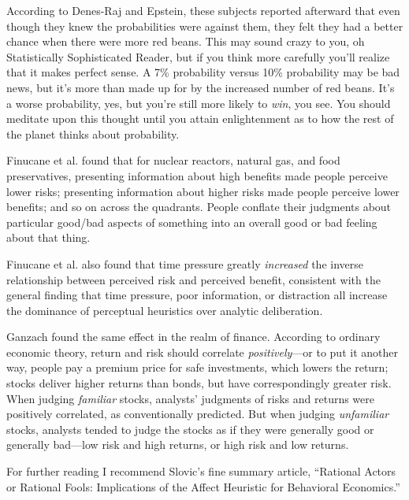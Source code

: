{
 According to Denes-Raj and Epstein, these subjects reported
afterward that even though they knew the probabilities were against
them, they felt they had a better chance when there were more red
beans. This may sound crazy to you, oh Statistically Sophisticated
Reader, but if you think more carefully you'll realize
that it makes perfect sense. A 7\% probability versus 10\% probability
may be bad news, but it's more than made up for by the
increased number of red beans. It's a worse
probability, yes, but you're still more likely to
\textit{win}, you see. You should meditate upon this thought until you
attain enlightenment as to how the rest of the planet thinks about
probability.}

{
 Finucane et al. found that for nuclear reactors, natural gas, and
food preservatives, presenting information about high benefits made
people perceive lower risks; presenting information about higher risks
made people perceive lower benefits; and so on across the
quadrants. People conflate their judgments about
particular good/bad aspects of something into an overall good or bad
feeling about that thing.}

{
 Finucane et al. also found that time pressure greatly
\textit{increased} the inverse relationship between perceived risk and
perceived benefit, consistent with the general finding that time
pressure, poor information, or distraction all increase the dominance
of perceptual heuristics over analytic deliberation.}

{
 Ganzach found the same effect in the realm of
finance. According to ordinary economic theory,
return and risk should correlate \textit{positively}{}---or to put it
another way, people pay a premium price for safe investments, which
lowers the return; stocks deliver higher returns than bonds, but have
correspondingly greater risk. When judging \textit{familiar} stocks,
analysts' judgments of risks and returns were
positively correlated, as conventionally predicted. But when judging
\textit{unfamiliar} stocks, analysts tended to judge the stocks as if
they were generally good or generally bad---low risk and high returns,
or high risk and low returns.}

{
 For further reading I recommend Slovic's fine
summary article, ``Rational Actors or Rational Fools:
Implications of the Affect Heuristic for Behavioral
Economics.''}

